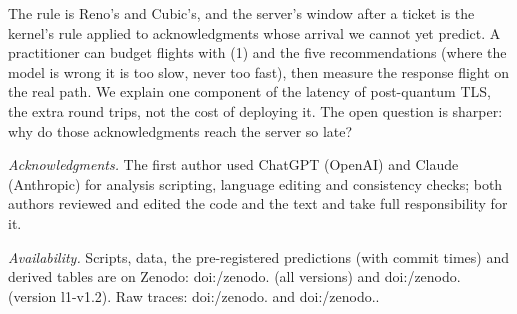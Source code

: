 \documentclass[sigconf,9pt,nonacm]{acmart}
\begin{document}
The rule is Reno's and Cubic's, and the server's window after a ticket is the kernel's rule applied to acknowledgments whose arrival we cannot yet predict. A practitioner can budget flights with (1) and the five recommendations (where the model is wrong it is too slow, never too fast), then measure the response flight on the real path. We explain one component of the latency of post-quantum TLS, the extra round trips, not the cost of deploying it. The open question is sharper: why do those acknowledgments reach the server so late?

\emph{Acknowledgments.} The first author used ChatGPT (OpenAI) and Claude (Anthropic) for analysis scripting, language editing and consistency checks; both authors reviewed and edited the code and the text and take full responsibility for it.
\par\emph{Availability.} Scripts, data, the pre-registered predictions (with commit times) and derived tables are on Zenodo: doi:/\allowbreak zenodo. (all versions) and doi:/\allowbreak zenodo. (version l1-v1.2). Raw traces: doi:/\allowbreak zenodo. and doi:/\allowbreak zenodo..



\end{document}
